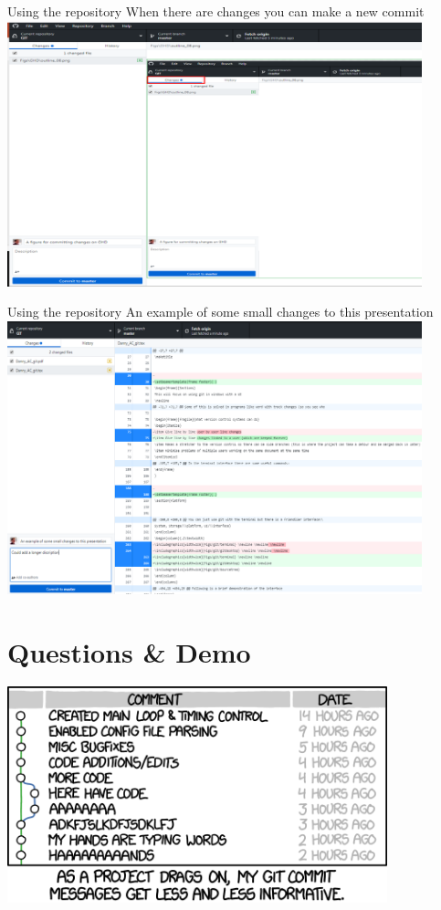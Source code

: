 \documentclass[10pt]{beamer}
\begin{document}
{\begin{frame}[fragile]{Using the repository}
\small When there are changes you can make a new commit
\includegraphics[width=12cm]{Figs/GHD/outline_08}
\end{frame}

\begin{frame}[fragile]{Using the repository}
\small An example of some small changes to this presentation
\includegraphics[width=12cm]{Figs/GHD/outline_10}
\end{frame}

\section{Questions \& Demo}

{%
{
\begin{frame}[standout]
\includegraphics[width=11cm]{Figs/xkcd_end}
\end{frame}
}


}}
\end{document}
